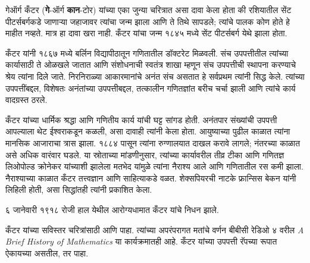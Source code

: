 \documentclass[../../../include/open-logic-section]{subfiles}
\begin{document}



गेऑर्ग कँटर (\textbf{गे}-ऑर्ग \textbf{कान}-टोर) यांच्या एका जुन्या चरित्रात असा दावा केला होता की रशियातील सेंट पीटर्सबर्गकडे जाणाऱ्या जहाजावर त्यांचा जन्म झाला आणि ते तिथे सापडले; त्यांचे पालक कोण होते हे माहीत नव्हते. मात्र हा दावा खरा नाही. कँटर यांचा जन्म १८४५ मध्ये सेंट पीटर्सबर्ग येथे झाला होता.

कँटर यांनी १८६७ मध्ये बर्लिन विद्यापीठातून गणितातील डॉक्टरेट मिळवली. संच उपपत्तीतील त्यांच्या कार्यासाठी ते ओळखले जातात आणि संशोधनाची स्वतंत्र शाखा म्हणून संच उपपत्तीची स्थापना करण्याचे श्रेय त्यांना दिले जाते. निरनिराळ्या आकारमानांचे अनंत संच असतात हे सर्वप्रथम त्यांनी सिद्ध केले. त्यांच्या उपपत्तींबद्दल, विशेषतः अनंतांच्या उपपत्तीबद्दल, तत्कालीन गणितज्ञांत बरीच चर्चा झाली आणि त्यांचे कार्य वादग्रस्त ठरले.

कँटर यांच्या धार्मिक श्रद्धा आणि गणितीय कार्य यांची घट्ट सांगड होती. अनंतपार संख्यांची उपपत्ती आपल्याला थेट ईश्वराकडून कळली, असा दावाही त्यांनी केला होता. आयुष्याच्या पुढील काळात त्यांना मानसिक आजाराचा त्रास झाला. १८८४ पासून त्यांना रुग्णालयात दाखल करावे लागले; नंतरच्या काळात असे अधिक वारंवार घडले. या स्रोताच्या मांडणीनुसार, त्यांच्या कार्यावरील तीव्र टीका आणि गणितज्ञ लिओपोल्ड क्रोनेकर यांच्याशी झालेला मतभेद यांमुळे त्यांना नैराश्य आले आणि गणितातील रस कमी झाला. नैराश्याच्या काळात कँटर तत्त्वज्ञान आणि साहित्याकडे वळत. शेक्सपियरची नाटके फ्रान्सिस बेकन यांनी लिहिली होती, असा सिद्धांतही त्यांनी प्रकाशित केला.

६ जानेवारी १९१८ रोजी हाल येथील आरोग्यधामात कँटर यांचे निधन झाले.

\begin{reading}
कँटर यांच्या सविस्तर चरित्रांसाठी \citet{Dauben1990} आणि \citet{Grattan-Guinness1971} पाहा. त्यांच्या अपरंपरागत मतांचे वर्णन बीबीसी रेडिओ ४ वरील \emph{A Brief History of Mathematics} \citep{Sautoy2014} या कार्यक्रमातही आहे. कँटर यांच्या उपपत्ती रॅपच्या रूपात ऐकायच्या असतील, तर \citet{Rose2012} पाहा.
\end{reading}
\end{document}
